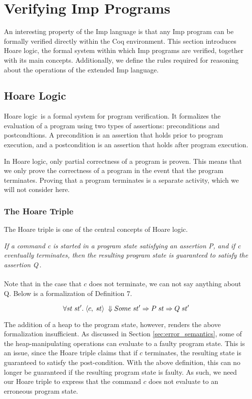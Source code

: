 \section{Verifying Imp Programs}
An interesting property of the Imp language is that any Imp program can be formally verified directly within the Coq environment. This section introduces Hoare logic, the formal system within which Imp programs are verified, together with its main concepts. Additionally, we define the rules required for reasoning about the operations of the extended Imp language.
\subsection{Hoare Logic}
Hoare logic\,\cite{Hoare69anaxiomatic} is a formal system for program verification. It formalizes the evaluation of a program using two types of assertions: preconditions and postcondtions. A precondition is an assertion that holds prior to program execution, and a postcondition is an assertion that holds after program execution.

In Hoare logic, only partial correctness of a program is proven. This means that we only prove the correctness of a program in the event that the program terminates. Proving that a program terminates is a separate activity, which we will not consider here.
\subsubsection{The Hoare Triple}
The Hoare triple is one of the central concepts of Hoare logic.

 \textit{If a command c is started in a program state satisfying an assertion P, and if c eventually terminates, then the resulting program state is guaranteed to satisfy the assertion Q}\,\cite{Pierce:SF}\textit{.}

\paragraph{}
Note that in the case that $c$ does not terminate, we can not say anything about Q. Below is a formalization of Definition 7.

\[
\forall st\;st'.\;\langle c,\;st\rangle\;\Downarrow Some\; st' \Rightarrow P\;st \Rightarrow Q\;st'
\]

The addition of a heap to the program state, however, renders the above formalization insufficient. As discussed in Section \ref{sec:error_semantics}, some of the heap-manipulating operations can evaluate to a faulty program state. This is an issue, since the Hoare triple claims that if $c$ terminates, the resulting state is guaranteed to satisfy the post-condition. With the above definition, this can no longer be guaranteed if the resulting program state is faulty. As such, we need our Hoare triple to express that the command $c$ does not evaluate to an erroneous program state.

